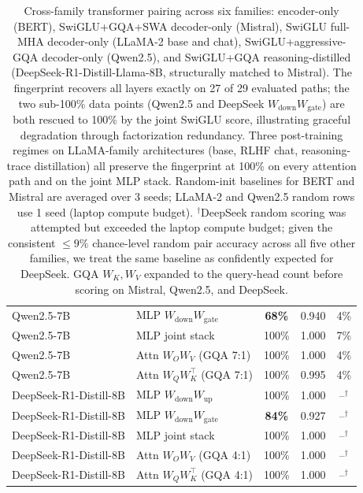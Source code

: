 \documentclass[wcp]{jmlr}
\begin{document}
\begin{table}[h]
\begin{tabular}{llccc}
Qwen2.5-7B      & MLP $W_{\text{down}} W_{\text{gate}}$  & \textbf{68\%}  & 0.940 & 4\% \\
Qwen2.5-7B      & MLP joint stack                        & 100\% & 1.000 & 7\% \\
Qwen2.5-7B      & Attn $W_O W_V$ (GQA 7:1)               & 100\% & 1.000 & 4\% \\
Qwen2.5-7B      & Attn $W_Q W_K^\top$ (GQA 7:1)          & 100\% & 0.995 & 4\% \\
\midrule
DeepSeek-R1-Distill-8B & MLP $W_{\text{down}} W_{\text{up}}$    & 100\% & 1.000 & --$^\dagger$ \\
DeepSeek-R1-Distill-8B & MLP $W_{\text{down}} W_{\text{gate}}$  & \textbf{84\%}  & 0.927 & --$^\dagger$ \\
DeepSeek-R1-Distill-8B & MLP joint stack                        & 100\% & 1.000 & --$^\dagger$ \\
DeepSeek-R1-Distill-8B & Attn $W_O W_V$ (GQA 4:1)               & 100\% & 1.000 & --$^\dagger$ \\
DeepSeek-R1-Distill-8B & Attn $W_Q W_K^\top$ (GQA 4:1)          & 100\% & 1.000 & --$^\dagger$ \\
\bottomrule
\end{tabular}
\caption{Cross-family transformer pairing across six families: encoder-only (BERT), SwiGLU+GQA+SWA decoder-only (Mistral), SwiGLU full-MHA decoder-only (LLaMA-2 base and chat), SwiGLU+aggressive-GQA decoder-only (Qwen2.5), and SwiGLU+GQA reasoning-distilled (DeepSeek-R1-Distill-Llama-8B, structurally matched to Mistral). The fingerprint recovers all layers exactly on 27 of 29 evaluated paths; the two sub-100\% data points (Qwen2.5 and DeepSeek $W_{\text{down}}W_{\text{gate}}$) are both rescued to 100\% by the joint SwiGLU score, illustrating graceful degradation through factorization redundancy. Three post-training regimes on LLaMA-family architectures (base, RLHF chat, reasoning-trace distillation) all preserve the fingerprint at 100\% on every attention path and on the joint MLP stack. Random-init baselines for BERT and Mistral are averaged over 3 seeds; LLaMA-2 and Qwen2.5 random rows use 1 seed (laptop compute budget). $^\dagger$DeepSeek random scoring was attempted but exceeded the laptop compute budget; given the consistent $\le 9\%$ chance-level random pair accuracy across all five other families, we treat the same baseline as confidently expected for DeepSeek. GQA $W_K,W_V$ expanded to the query-head count before scoring on Mistral, Qwen2.5, and DeepSeek.}
\label{tab:transformer_family}
\end{table}
\end{document}
